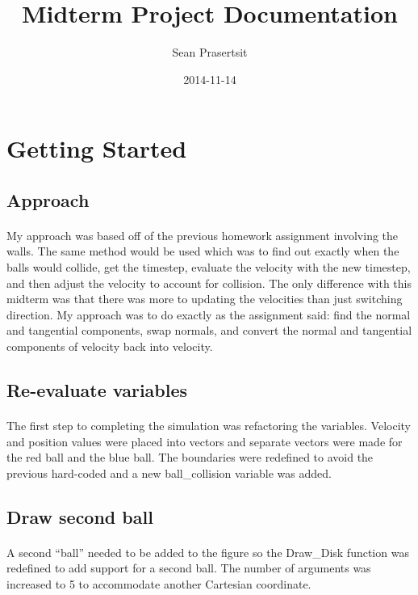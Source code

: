 \documentclass[12pt,final]{report}
\begin{document}
\title{Midterm Project Documentation}
\author{Sean Prasertsit}
\date{2014-11-14}
\maketitle

\section{Getting Started}

\subsection{Approach}
\paragraph{}	My approach was based off of the previous homework assignment involving the walls. The same method would be used which was to find out exactly when the balls would collide, get the timestep, evaluate the velocity with the new timestep, and then adjust the velocity to account for collision. The only difference with this midterm was that there was more to updating the velocities than just switching direction. My approach was to do exactly as the assignment said: find the normal and tangential components, swap normals, and convert the normal and tangential components of velocity back into velocity.

\subsection{Re-evaluate variables}
\paragraph{}	The first step to completing the simulation was refactoring the variables. Velocity and position values were placed into vectors and separate vectors were made for the red ball and the blue ball. The boundaries were redefined to avoid the previous hard-coded and a new {\ttfamily ball\_collision} variable was added.

\subsection{Draw second ball}
\paragraph{}	A second ``ball'' needed to be added to the figure so the {\ttfamily Draw\_Disk} function was redefined to add support for a second ball. The number of arguments was increased to 5 to accommodate another Cartesian coordinate.
\end{document}

